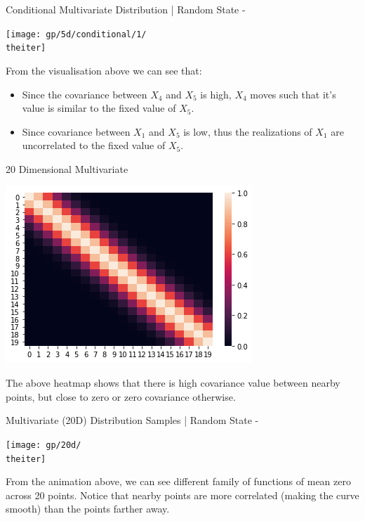 \documentclass{beamer}
\begin{document}
	{%
		\begin{frame}{Conditional Multivariate Distribution | Random State - \theiter}
			\begin{center}
				\texttt{[image: gp/5d/conditional/1/\\theiter]}
			\end{center}
			From the visualisation above we can see that:
			\begin{itemize}
				\item Since the covariance between $X_4$ and $X_5$ is high, $X_4$ moves such that it's value is similar to the fixed value of $X_5$.
				\item Since covariance between $X_1$ and $X_5$ is low, thus the realizations of $X_1$ are uncorrelated to the fixed value of $X_5$.
			\end{itemize}
		\end{frame}
	}
	
	\begin{frame}{20 Dimensional Multivariate}
		\begin{center}
			\includegraphics[width=\linewidth, height=\textheight -120pt ,keepaspectratio]{gp/20d}\\
		\end{center}	
		The above heatmap shows that there is high covariance value between nearby points, but close to zero or zero covariance otherwise.
	\end{frame}
	
	{%
		\begin{frame}{Multivariate (20D) Distribution Samples | Random State - \theiter}
			\begin{center}
				\texttt{[image: gp/20d/\\theiter]}
			\end{center}
			From the animation above, we can see different family of functions of mean zero across 20 points. Notice that nearby points are more correlated (making the curve smooth) than the points farther away.
		\end{frame}
	}
	
\end{document}
